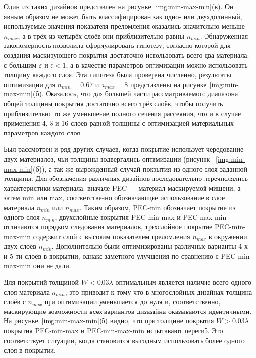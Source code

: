 Один из таких дизайнов представлен на
рисунке~\ref{img:min-max-min}(в). Он явным образом не может быть
классифицирован как одно- или двухдолинный, используемые значения
показателя преломления оказались значительно меньше $n_{max}$, а в
трёх из четырёх слоёв они приблизительно равны $n_{min}$.
Обнаруженная закономерность позволила сформулировать гипотезу,
согласно которой для создания маскирующего покрытия достаточно
использовать всего два материала: с большим $\varepsilon$ и
${\varepsilon<1}$, а в качестве параметров оптимизации можно
использовать толщину каждого слоя. Эта гипотеза была проверена
численно, результаты оптимизации для $n_{min}=0.67$ и $n_{max}=8$
представлены на рисунке~\ref{img:min-max-min}(б). Оказалось, что для
большей части рассматриваемого диапазона общей толщины покрытия
достаточно всего трёх слоёв, чтобы получить приблизительно то же
уменьшение полного сечения рассеяния, что и в случае применения 4, 8 и
16 слоёв равной толщины с оптимизацией материальных параметров каждого
слоя.

Был рассмотрен и ряд других случаев, когда покрытие использует
чередование двух материалов, чьи толщины подвергались оптимизации
(рисунок ~\ref{img:min-max-min}(б)), а так же вырожденный случай
покрытия из одного слоя заданной толщины.  Для обозначения различных
дизайнов последовательно перечислялись характеристики материала:
вначале PEC --- материал маскируемой мишени, а затем min или max,
соответственно обозначающие использование в слое материала $n_{min}$
или $n_{max}$. Таким образом, PEC-min обозначает покрытие из одного
слоя $n_{min}$, двухслойные покрытия PEC-min-max и PEC-max-min
отличаются порядком следования материалов, трехслойное покрытие
PEC-min-max-min содержит слой с высоким показателем преломления
$n_{max}$ в окружении двух слоёв $n_{min}$. Дополнительно были
оптимизированы различные варианты 4-х и 5-ти слоёв в покрытии, однако
заметного улучшения по сравнению с PEC-min-max-min они не дали.

Для покрытий толщиной $W<0.03\lambda$ оптимальным является наличие
всего одного слоя материала $n_{min}$, это приводит к тому что в
многослойных дизайнах толщина слоёв с $n_{max}$ при оптимизации
уменьшается до нуля и, соответственно, маскирующие возможности всех
вариантов дизазайна оказываются идентичными. На
рисунке~\ref{img:min-max-min}(б) видно, что при толщине покрытия
$W>0.03\lambda$ покрытия PEC-min-max и PEC-min-max-min испытавают
перегиб. Это соответствует ситуации, когда становится выгодным
использовать более одного слоя в покрытии.

